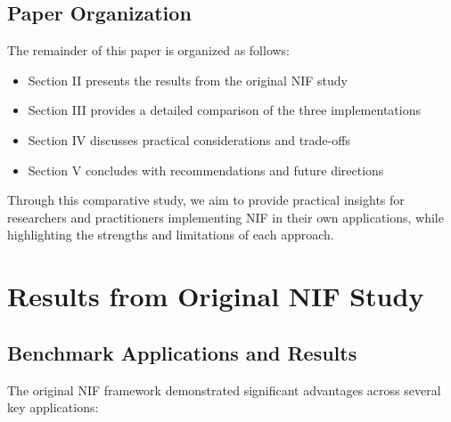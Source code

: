 \documentclass[10pt,journal,compsoc]{IEEEtran}
\begin{document}
\subsection{Paper Organization}
The remainder of this paper is organized as follows:

\begin{itemize}
    \item Section II presents the results from the original NIF study
    \item Section III provides a detailed comparison of the three implementations
    \item Section IV discusses practical considerations and trade-offs
    \item Section V concludes with recommendations and future directions
\end{itemize}

Through this comparative study, we aim to provide practical insights for researchers and practitioners implementing NIF in their own applications, while highlighting the strengths and limitations of each approach.

\section{Results from Original NIF Study}
\subsection{Benchmark Applications and Results}
The original NIF framework demonstrated significant advantages across several key applications:
\end{document}

